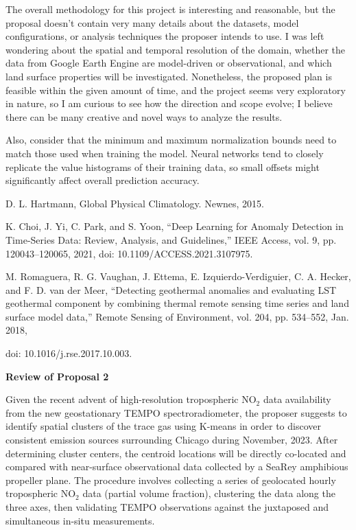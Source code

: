 \documentclass[12pt]{article}
\begin{document}
The overall methodology for this project is interesting and reasonable, but the proposal doesn't contain very many details about the datasets, model configurations, or analysis techniques the proposer intends to use. I was left wondering about the spatial and temporal resolution of the domain, whether the data from Google Earth Engine are model-driven or observational, and which land surface properties will be investigated. Nonetheless, the proposed plan is feasible within the given amount of time, and the project seems very exploratory in nature, so I am curious to see how the direction and scope evolve; I believe there can be many creative and novel ways to analyze the results.

Also, consider that the minimum and maximum normalization bounds need to match those used when training the model. Neural networks tend to closely replicate the value histograms of their training data, so small offsets might significantly affect overall prediction accuracy.

\vspace{1em}
\noindent
[1] D. L. Hartmann, Global Physical Climatology. Newnes, 2015.

\vspace{1em}
\noindent
[2] K. Choi, J. Yi, C. Park, and S. Yoon, “Deep Learning for Anomaly Detection in Time-Series Data: Review, Analysis, and Guidelines,” IEEE Access, vol. 9, pp. 120043–120065, 2021, doi: 10.1109/ACCESS.2021.3107975.

\vspace{1em}
\noindent
[3] M. Romaguera, R. G. Vaughan, J. Ettema, E. Izquierdo-Verdiguier, C. A. Hecker, and F. D. van der Meer, “Detecting geothermal anomalies and evaluating LST geothermal component by combining thermal remote sensing time series and land surface model data,” Remote Sensing of Environment, vol. 204, pp. 534–552, Jan. 2018,

\noindent
doi: 10.1016/j.rse.2017.10.003.


\newpage

\noindent
{\large\textbf{Review of Proposal 2}}

Given the recent advent of high-resolution tropospheric NO$_2$ data availability from the new geostationary TEMPO spectroradiometer, the proposer suggests to identify spatial clusters of the trace gas using K-means in order to discover consistent emission sources surrounding Chicago during November, 2023. After determining cluster centers, the centroid locations will be directly co-located and compared with near-surface observational data collected by a SeaRey amphibious propeller plane. The procedure involves collecting a series of geolocated hourly tropospheric NO$_2$ data (partial volume fraction), clustering the data along the three axes, then validating TEMPO observations against the juxtaposed and simultaneous in-situ measurements.
\end{document}
